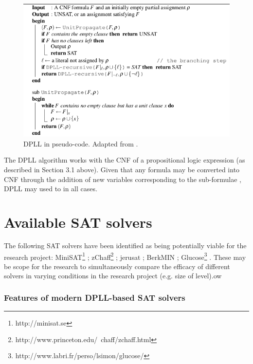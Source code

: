 \documentclass[11pt, a4paper, oneside]{report} %
\begin{document}
\begin{figure}[h!]

  \centering
    \includegraphics[scale=0.47]{dpll}
  \caption{DPLL in pseudo-code. Adapted from \cite{balyo2010solving,gomes2008satisfiability}.}
  \label{DPLL}
\end{figure}

The DPLL algorithm works with the CNF of a propositional logic expression (as
described in Section 3.1 above). Given that any formula may be converted into
CNF through the addition of new variables corresponding to the sub-formulae
\cite{tseitin1983complexity,Goldreich:2008}, DPLL may used to in all cases.

\section{Available SAT solvers}

The following SAT solvers have been identified as being potentially viable for
the research project: MiniSAT\footnote{http://minisat.se}
\cite{sorensson2005minisat};
zChaff\footnote{http://www.princeton.edu/~chaff/zchaff.html}
\cite{marques1999impact}; jerusat \cite{nadel2002jerusat}; BerkMIN
\cite{Goldberg20071549};
Glucose\footnote{http://www.labri.fr/perso/lsimon/glucose/}
\cite{audemard2009glucose}. These may be scope for the research to
simultaneously compare the efficacy of different solvers in varying conditions
in the research project (e.g. size of level).ow


\subsubsection{Features of modern DPLL-based SAT solvers}
\end{document}
